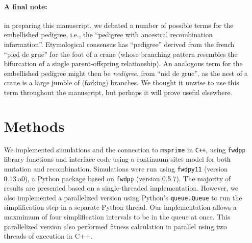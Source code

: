 \documentclass{article}
\newcommand{\fwdpp}{\texttt{fwdpp}}
\newcommand{\fwdpy}{\texttt{fwdpy11}}
\newcommand{\justc}{\texttt{C}}
\newcommand{\cpp}{\texttt{C++}}
\newcommand{\msprime}{\texttt{msprime}}
\begin{document}

\paragraph{A final note:}
in preparing this manuscript,
we debated a number of possible terms for the embellished pedigree,
i.e., the ``pedigree with ancestral recombination information''.
Etymological consensus \citep{liberman2014little} has
``pedigree'' derived from the french ``pied de grue'' for the foot of a crane
(whose branching pattern resembles the bifurcation of a single parent-offspring relationship).
An analogous term for the embellished pedigree might then be \emph{nedigree},
from ``nid de grue'',
as the nest of a crane is a large jumble of (forking) branches.
We thought it unwise to use this term throughout the manuscript,
but perhaps it will prove useful elsewhere.


\section*{Methods}

We implemented simulations and the connection to \msprime{} in \cpp{}, using \fwdpp{} library functions and
interface code using a continuum-sites model for both mutation
and recombination. Simulations were run using \fwdpy{} (version 0.13.a0), a Python package based
on \fwdpp{} (version 0.5.7).  The majority of results are presented based on a single-threaded implementation.  However,
we also implemented a parallelized version using Python's \texttt{queue.Queue} to run the simplification step in a separate Python
thread. Our implementation allows a maxmimum of four simplification intervals to be in the queue at once. This
parallelized version also performed fitness calculation in parallel using two threads of execution in C++.
\end{document}
